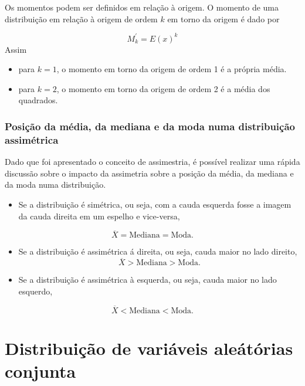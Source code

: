 \documentclass[
]{book}
\providecommand{\tightlist}{%
  \setlength{\itemsep}{0pt}\setlength{\parskip}{0pt}}
\begin{document}
Os momentos podem ser definidos em relação à origem. O momento de uma distribuição em relação à origem de ordem \(k\) em torno da origem é dado por

\[
  M_k^{'} = E(x)^k
\]
Assim

\begin{itemize}
\tightlist
\item
  para \(k=1\), o momento em torno da origem de ordem 1 é a própria média.
\item
  para \(k=2\), o momento em torno da origem de ordem 2 é a média dos quadrados.
\end{itemize}

\hypertarget{posiuxe7uxe3o-da-muxe9dia-da-mediana-e-da-moda-numa-distribuiuxe7uxe3o-assimuxe9trica}{%
\subsection{Posição da média, da mediana e da moda numa distribuição assimétrica}\label{posiuxe7uxe3o-da-muxe9dia-da-mediana-e-da-moda-numa-distribuiuxe7uxe3o-assimuxe9trica}}

Dado que foi apresentado o conceito de assimestria, é possível realizar uma rápida discussão sobre o impacto da assimetria sobre a posição da média, da mediana e da moda numa distribuição.

\begin{itemize}
\tightlist
\item
  Se a distribuição é simétrica, ou seja, com a cauda esquerda fosse a imagem da cauda direita em um espelho e vice-versa,
\end{itemize}

\[
  \overline{X} = \text{Mediana} = \text{Moda}.
\]

\begin{itemize}
\item
  Se a distribuição é assimétrica á direita, ou seja, cauda maior no lado direito,
  \[
  \overline{X} > \text{Mediana} > \text{Moda}.
  \]
\item
  Se a distribuição é assimétrica à esquerda, ou seja, cauda maior no lado esquerdo,
\end{itemize}

\[
  \overline{X} < \text{Mediana} < \text{Moda}.
\]

\hypertarget{distribuiuxe7uxe3o-de-variuxe1veis-aleuxe1tuxf3rias-conjunta}{%
\chapter{Distribuição de variáveis aleátórias conjunta}\label{distribuiuxe7uxe3o-de-variuxe1veis-aleuxe1tuxf3rias-conjunta}}
\end{document}
